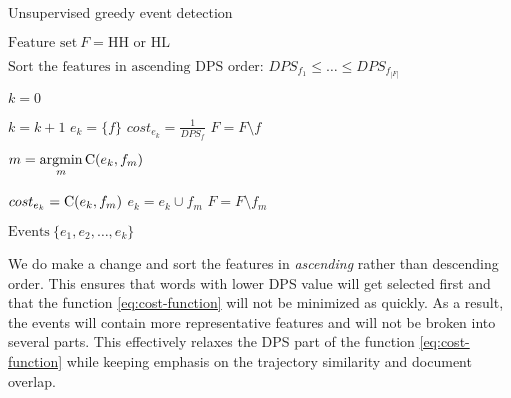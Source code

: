 \begin{algorithm}[H]
\begin{algorithmic}[1]
\caption{Unsupervised greedy event detection}
\Input $\text{Feature set} ~ F = \text{HH or HL}$

\State $\text{Sort the features in ascending DPS order: } DPS_{f_{1}} \leq \dots \leq DPS_{f_{\left\vert F \right\vert}}$

\State $k = 0$

	\State $k = k + 1$	
	\State $e_{k} = \{ f \}$
	\State $cost_{e_{k}} = \frac{1}{DPS_{f}}$
	\State $F = F \setminus f$
	
		\State $m = \operatorname*{argmin}\limits_{m}{\text{C}( e_{k}, f_{m} )}$

			\State $cost_{e_{k}} = \text{C}( e_{k}, f_{m} )$
			\State $e_{k} = e_{k} \cup f_{m}$
			\State $F = F \setminus f_{m}$
		\Else
			\Break
		\EndIf
	\EndWhile
\EndFor

\Output $\text{Events} ~ \{ e_{1}, e_{2}, \dots, e_{k} \}$
\end{algorithmic}
\end{algorithm}

We do make a change and sort the features in \textit{ascending} rather than descending order. This ensures that words with lower DPS value will get selected first and that the function \ref{eq:cost-function} will not be minimized as quickly. As a result, the events will contain more representative features and will not be broken into several parts. This effectively relaxes the DPS part of the function \ref{eq:cost-function} while keeping emphasis on the trajectory similarity and document overlap.